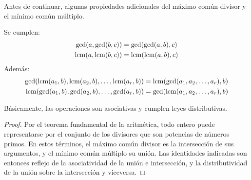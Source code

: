   Antes de continuar,
  algunas propiedades adicionales del máximo común divisor
  y el mínimo común múltiplo.
  \begin{lemma}
    \label{lem:gcd-lcm}
    Se cumplen:
    \begin{align*}
      \gcd(a, \gcd(b, c))
	&= \gcd(\gcd(a, b), c) \\
      \operatorname{lcm}(a, \operatorname{lcm}(b, c))
	&= \operatorname{lcm}(\operatorname{lcm}(a, b), c)
    \end{align*}
    Además:
    \begin{align*}
      \gcd(\operatorname{lcm}(a_1, b), \operatorname{lcm}(a_2, b), \dotsc, \operatorname{lcm}(a_r, b))
	&= \operatorname{lcm}(\gcd(a_1, a_2, \dotsc, a_r), b) \\
      \operatorname{lcm}(\gcd(a_1, b), \gcd(a_2, b), \dotsc, \gcd(a_r, b))
	&= \gcd(\operatorname{lcm}(a_1, a_2, \dotsc, a_r), b)
    \end{align*}
  \end{lemma}
  Básicamente,
  las operaciones son asociativas y cumplen leyes distributivas.
  \begin{proof}
    Por el teorema fundamental de la aritmética,%
    todo entero puede representarse por el conjunto
    de los divisores que son potencias de números primos.
    En estos términos,
    el máximo común divisor es la intersección de sus argumentos,
    y el mínimo común múltiplo su unión.
    Las identidades indicadas
    son entonces reflejo de la asociatividad
    de la unión e intersección,
    y la distributividad de la unión sobre la intersección
    y viceversa.
  \end{proof}

